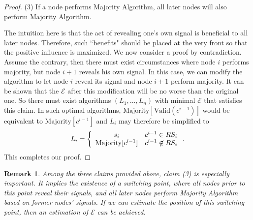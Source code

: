 \documentclass[a4paper,UKenglish]{lipics}
\newtheorem{rmk}{Remark}
\theoremstyle{definition}
\begin{document}
\begin{proof}
(3) If a node performs Majority Algorithm, all later nodes will also perform Majority Algorithm.
 
The intuition here is that the act of revealing one's own signal is beneficial to all later nodes. 
Therefore, such ``benefits" should be placed at the very front so that the positive influence is maximized.
We now consider a proof by contradiction. 
Assume the contrary, then there must exist circumstances where node $i$ performs majority, but node $i + 1$ reveals his own signal. 
In this case, we can modify the algorithm to let node $i$ reveal its signal and node $i+1$ perform majority. 
It can be shown that the $\mathcal{E}$ after this modification will be no worse than the original one. 
So there must exist algorithms $(L_1, \dots, L_n)$ with minimal $\mathcal{E}$ that satisfies this claim.
In such optimal algorithms, $\text{Majority}[\text{Valid}(c^{i-1})]$ would be equivalent to $\text{Majority}[c^{i-1}]$
	and $L_i$ may therefore be simplified to
\begin{equation*}
L_i 
= \left\{ 
	\begin{array}{c l}
		s_i & c^{i-1} \in RS_i \\
 		\text{Majority}[c^{i-1}] & c^{i-1} \not\in RS_i
 	\end{array}
	\right..
\end{equation*}
This completes our proof.
\end{proof}

\begin{rmk}
\label{rmk1}
Among the three claims provided above, claim (3) is especially important.
It implies the existence of a switching point, 
	where all nodes prior to this point reveal their signals, 
	and all later nodes perform Majority Algorithm based on former nodes' signals. 
If we can estimate the position of this switching point,
	then an estimation of $\mathcal{E}$ can be achieved.
\end{rmk}
\end{document}
